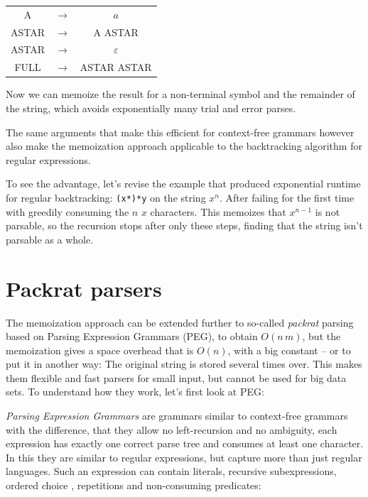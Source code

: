 \documentclass[11pt,a4paper,twoside,openright]{Thesis}
\theoremstyle{definition}
\begin{document}
\begin{center}
\begin{tabular}{ccc}
A& $\rightarrow$ & $a$\\
ASTAR & $\rightarrow$ & A ASTAR \\
ASTAR & $\rightarrow$ & $\varepsilon$ \\
FULL & $\rightarrow$ & ASTAR ASTAR \\
\end{tabular}
\end{center}

Now we can memoize the result for a non-terminal symbol and the remainder of
the string, which avoids exponentially many trial and error parses.

The same arguments that make this efficient for context-free grammars however
also make the memoization approach applicable to the backtracking algorithm
for regular expressions.

To see the advantage, let's revise the example that produced exponential runtime
for regular backtracking: \texttt{(x*)*y} on the string $x^n$. After failing
for the first time with greedily consuming the $n$ $x$ characters. This
memoizes that $x^{n-1}$ is not parsable, so the recursion stops after only
these steps, finding that the string isn't parsable as a whole.

\section{Packrat parsers}
The memoization approach can be extended further to so-called \emph{packrat}
parsing\cite{Mede12a} based on Parsing Expression Grammars (PEG), to obtain
$O(n\,m)$, but the memoization gives a space overhead that is
$O(n)$, with a big constant\cite{Ford02a} -- or to put it in another way: The
original string is stored several times over. This makes them flexible and fast
parsers for small input, but cannot be used for big data sets. To understand
how they work, let's first look at PEG:

\emph{Parsing Expression Grammars} are grammars similar to context-free
grammars with the difference, that they allow no left-recursion and no
ambiguity, each expression has exactly one correct parse tree and consumes at
least one character. In this they are similar to regular expressions, but
capture more than just regular languages.  Such an expression can contain
literals, recursive subexpressions, ordered choice , repetitions and
non-consuming predicates:
\end{document}
